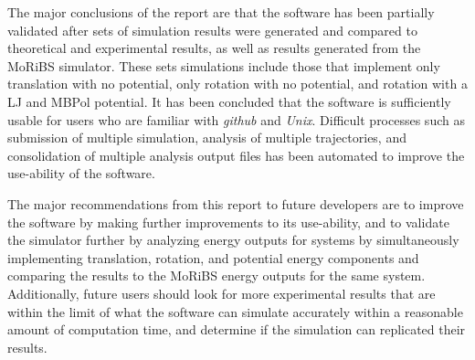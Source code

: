 \documentclass[11pt]{article}
\makeatletter
\let\workreportsection\section
\renewcommand{\section}{\@ifstar{\workreportstarsection}{\workreportsection}}
\newcommand{\workreportstarsection}[1]{\workreportsection*{#1}\addcontentsline{toc}{section}{#1}}
\makeatother
\begin{document}
The major conclusions of the report are that the software has been partially validated after sets of simulation results were generated and compared to theoretical and experimental results, as well as results generated from the MoRiBS simulator. These sets simulations include those that implement only translation with no potential, only rotation with no potential, and rotation with a LJ and MBPol potential. It has been concluded that the software is sufficiently usable for users who are familiar with \textit{github} and \textit{Unix}. Difficult processes such as submission of multiple simulation, analysis of multiple trajectories, and consolidation of multiple analysis output files has been automated to improve the use-ability of the software.

The major recommendations from this report to future developers are to improve the software by making further improvements to its use-ability, and to validate the simulator further by analyzing energy outputs for systems by simultaneously implementing translation, rotation, and potential energy components and comparing the results to the MoRiBS energy outputs for the same system. Additionally, future users should look for more experimental results that are within the limit of what the software can simulate accurately within a reasonable amount of computation time, and determine if the simulation can replicated their results.

\tableofcontents







\section{Introduction}
\end{document}
